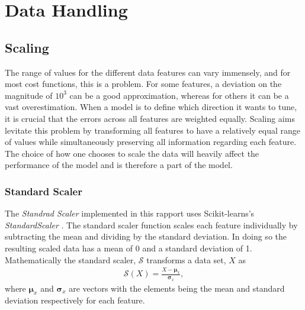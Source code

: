 \section{Data Handling}\label{subsec:Scaling}
\subsection{Scaling}
The range of values for the different data features can vary immensely, and for most 
cost functions, this is a problem. For some features, a deviation on the magnitude 
of $10^3$ can be a good approximation, whereas for others it can be a vast 
overestimation. When a model is to define which direction it wants to tune, it is 
crucial that the errors across all features are weighted equally. Scaling aims levitate 
this problem by transforming all features to have a relatively equal range of values while
simultaneously preserving all information regarding each feature. The choice of how one 
chooses to scale the data will heavily affect the performance of the model and is therefore
a part of the model. 
\\
\subsubsection{Standard Scaler}\label{subsubsec:StandardScalar}
The \emph{Standrad Scaler} implemented in this rapport uses Scikit-learns's \emph{StandardScaler}
\cite{StandardScaler}. The standard scaler function scales each feature individually by subtracting 
the mean and dividing by the standard deviation. In doing so the resulting scaled data has a mean 
of 0 and a standard deviation of 1. Mathematically the standard scaler, $\mathcal{S}$ transforms 
a data set, $X$ as 
\begin{align}
    \mathcal{S} \left(X\right) = \frac{X - \boldsymbol{\mu} _x}{\boldsymbol{\sigma}_x} ,
\end{align}
where $\boldsymbol{\mu} _x$ and $\boldsymbol{\sigma}_x$ are vectors with the elements being 
the mean and standard deviation respectively for each feature.


